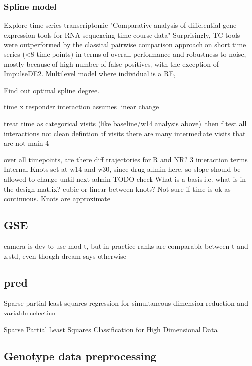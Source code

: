 \begin{outline}
\subsubsection{Spline model}

Explore time series transcriptomic
    "Comparative analysis of differential gene expression tools for RNA sequencing time course data"
    Surprisingly, TC tools were outperformed by the classical pairwise comparison approach on short time series (<8 time points) in terms of overall performance and robustness to noise, mostly because of high number of false positives, with the exception of ImpulseDE2.
Multilevel model where individual is a RE, 

Find out optimal spline degree.

time x responder interaction
    assumes linear change

treat time as categorical visits (like baseline/w14 analysis above), then f test all interactions
    not clean defintion of visits
    there are many intermediate visits that are not main 4

over all timepoints, are there diff trajectories for R and NR?
3 interaction terms
Internal Knots set at w14 and w30, since drug admin here, so slope should be allowed to change until next admin
TODO check What is a basis i.e. what is in the design matrix?
cubic or linear between knots?
Not sure if time is ok as continuous. Knots are approximate

\subsection{GSE}

camera is dev to use mod t, but in practice ranks are comparable between t and z.std, even though dream says otherwise

\subsection{pred}

Sparse partial least squares regression for simultaneous dimension reduction and variable selection

 Sparse Partial Least Squares Classification for High Dimensional Data 

\subsection{Genotype data preprocessing}


\end{outline}
